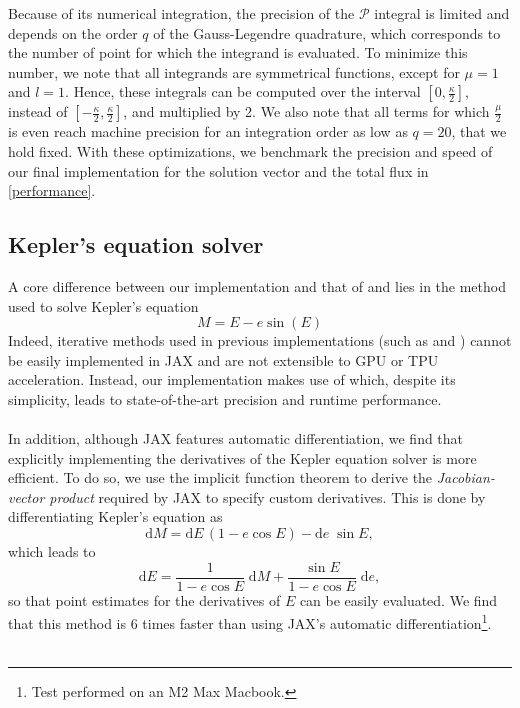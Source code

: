 \documentclass[modern]{aastex631}
\begin{document}
Because of its numerical integration, the precision of the $\mathcal{P}$ integral is limited and depends on the order $q$ of the Gauss-Legendre quadrature, which corresponds to the number of point for which the integrand is evaluated. To minimize this number, we note that all integrands are symmetrical functions, except for $\mu=1$ and $l=1$. Hence, these integrals can be computed over the interval $\left[0, \frac{\kappa}{2}\right]$, instead of $\left[-\frac{\kappa}{2}, \frac{\kappa}{2}\right]$, and multiplied by 2. We also note that all terms for which $\frac{\mu}{2}$ is even reach machine precision for an integration order as low as $q=20$, that we hold fixed. With these optimizations, we benchmark the precision and speed of our final implementation for the solution vector and the total flux in \autoref{performance}.

\subsection{Kepler's equation solver}
A core difference between our implementation and that of \cite{starry} and \cite{exoplanet} lies in the method used to solve Kepler's equation
\begin{equation}
    M = E - e \sin(E)
\end{equation}
Indeed, iterative methods used in previous implementations (such as \citealt{Raposo2017} and \citealt{Brandt2021}) cannot be easily implemented in \textsf{JAX} and are not extensible to GPU or TPU acceleration. Instead, our implementation makes use of \cite{Markley1995} which, despite its simplicity, leads to state-of-the-art precision and runtime performance.\\\\
In addition, although \textsf{JAX} features automatic differentiation, we find that explicitly implementing the derivatives of the Kepler equation solver is more efficient. To do so, we use the implicit function theorem to derive the \textit{Jacobian-vector product} required by \textsf{JAX} to specify custom derivatives. This is done by differentiating Kepler's equation as
\begin{equation}
    \mathrm{d}M = \mathrm{d}E\,(1 - e \cos E) - \mathrm{d}e\;\sin E,
\end{equation}
which leads to
\begin{equation}
\mathrm{d}E = \frac{1}{1 - e \cos E}\;\mathrm{d}M + \frac{\sin E}{1 - e \cos E}\;\mathrm{d}e,
\end{equation}
so that point estimates for the derivatives of $E$ can be easily evaluated. We find that this method is 6 times faster than using \textsf{JAX}'s automatic differentiation\footnote{Test performed on an M2 Max Macbook.}.\\\\
\end{document}
